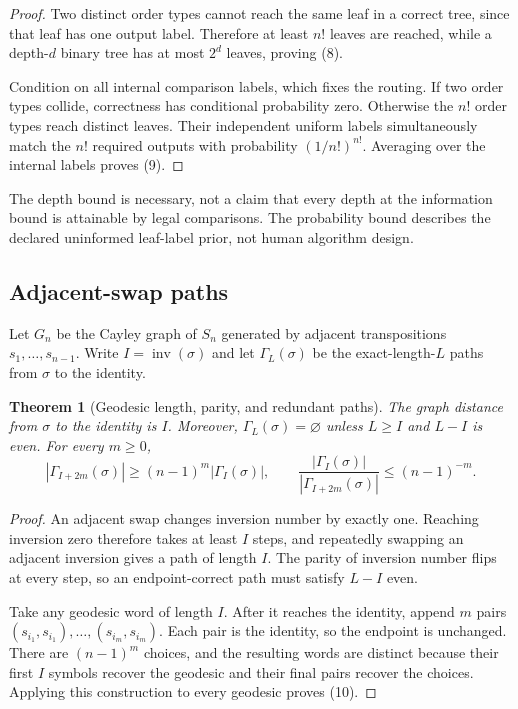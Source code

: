 \documentclass[10pt]{article}
\newtheorem{theorem}{Theorem}
\theoremstyle{definition}
\begin{document}
\begin{proof}
Two distinct order types cannot reach the same leaf in a correct tree, since
that leaf has one output label.  Therefore at least $n!$ leaves are reached,
while a depth-$d$ binary tree has at most $2^d$ leaves, proving (8).

Condition on all internal comparison labels, which fixes the routing.  If two
order types collide, correctness has conditional probability zero.  Otherwise
the $n!$ order types reach distinct leaves.  Their independent uniform labels
simultaneously match the $n!$ required outputs with probability
$(1/n!)^{n!}$.  Averaging over the internal labels proves (9).
\end{proof}

The depth bound is necessary, not a claim that every depth at the information
bound is attainable by legal comparisons.  The probability bound describes
the declared uninformed leaf-label prior, not human algorithm design.

\subsection{Adjacent-swap paths}

Let $G_n$ be the Cayley graph of $S_n$ generated by adjacent transpositions
$s_1,\ldots,s_{n-1}$.  Write $I=\operatorname{inv}(\sigma)$ and let
$\Gamma_L(\sigma)$ be the exact-length-$L$ paths from $\sigma$ to the identity.

\begin{theorem}[Geodesic length, parity, and redundant paths]
The graph distance from $\sigma$ to the identity is $I$.  Moreover,
$\Gamma_L(\sigma)=\varnothing$ unless $L\ge I$ and $L-I$ is even.  For every
$m\ge0$,
\[
 |\Gamma_{I+2m}(\sigma)|
 \ge (n-1)^m|\Gamma_I(\sigma)|,
 \qquad
 \frac{|\Gamma_I(\sigma)|}{|\Gamma_{I+2m}(\sigma)|}
 \le(n-1)^{-m}.
 \tag{10}
\]
\end{theorem}

\begin{proof}
An adjacent swap changes inversion number by exactly one.  Reaching inversion
zero therefore takes at least $I$ steps, and repeatedly swapping an adjacent
inversion gives a path of length $I$.  The parity of inversion number flips at
every step, so an endpoint-correct path must satisfy $L-I$ even.

Take any geodesic word of length $I$.  After it reaches the identity, append
$m$ pairs $(s_{i_1},s_{i_1}),\ldots,(s_{i_m},s_{i_m})$.  Each pair is the
identity, so the endpoint is unchanged.  There are $(n-1)^m$ choices, and the
resulting words are distinct because their first $I$ symbols recover the
geodesic and their final pairs recover the choices.  Applying this construction
to every geodesic proves (10).
\end{proof}
\end{document}
